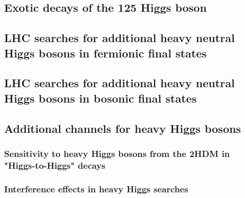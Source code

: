 \documentclass[../report.tex]{subfiles}
\providecommand{\main}{..}
\begin{document}
 

%

\subsection{Exotic decays of the 125 \UGeV Higgs boson}\label{Sec:9.1Exo}









\subsection{LHC searches for additional heavy neutral Higgs bosons in fermionic final states}\label{sec:Hff}




\subsection{LHC searches for additional heavy neutral Higgs bosons in bosonic final states}\label{sec:XZZ}


\subsection{Additional channels for heavy Higgs bosons}\label{Sec:9.4}




\subsubsection{Sensitivity to heavy Higgs bosons from the 2HDM in "Higgs-to-Higgs" decays}




\subsubsection{Interference effects in heavy Higgs searches}\label{Sec.9.4.2}

\end{document}
